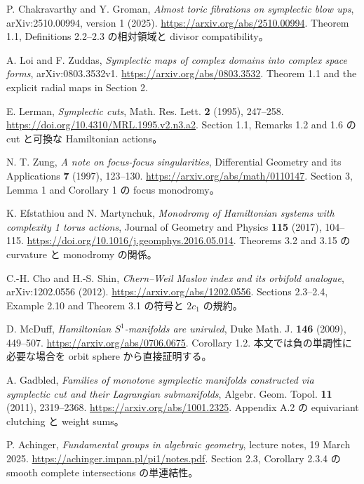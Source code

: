 P. Chakravarthy and Y. Groman,
\emph{Almost toric fibrations on symplectic blow ups},
arXiv:2510.00994, version 1 (2025).
\url{https://arxiv.org/abs/2510.00994}.
Theorem 1.1, Definitions 2.2--2.3 の相対領域と divisor compatibility。

A. Loi and F. Zuddas,
\emph{Symplectic maps of complex domains into complex space forms},
arXiv:0803.3532v1.
\url{https://arxiv.org/abs/0803.3532}.
Theorem 1.1 and the explicit radial maps in Section 2.


E. Lerman,
\emph{Symplectic cuts},
Math. Res. Lett. \textbf{2} (1995), 247--258.
\url{https://doi.org/10.4310/MRL.1995.v2.n3.a2}.
Section 1.1, Remarks 1.2 and 1.6 の cut と可換な Hamiltonian actions。

N. T. Zung,
\emph{A note on focus-focus singularities},
Differential Geometry and its Applications \textbf{7} (1997), 123--130.
\url{https://arxiv.org/abs/math/0110147}.
Section 3, Lemma 1 and Corollary 1 の focus monodromy。

K. Efstathiou and N. Martynchuk,
\emph{Monodromy of Hamiltonian systems with complexity 1 torus actions},
Journal of Geometry and Physics \textbf{115} (2017), 104--115.
\url{https://doi.org/10.1016/j.geomphys.2016.05.014}.
Theorems 3.2 and 3.15 の curvature と monodromy の関係。

C.-H. Cho and H.-S. Shin,
\emph{Chern--Weil Maslov index and its orbifold analogue},
arXiv:1202.0556 (2012).
\url{https://arxiv.org/abs/1202.0556}.
Sections 2.3--2.4, Example 2.10 and Theorem 3.1 の符号と $2c_1$ の規約。


D. McDuff,
\emph{Hamiltonian $S^1$-manifolds are uniruled},
Duke Math. J. \textbf{146} (2009), 449--507.
\url{https://arxiv.org/abs/0706.0675}.
Corollary 1.2. 本文では負の単調性に必要な場合を orbit sphere から直接証明する。

A. Gadbled,
\emph{Families of monotone symplectic manifolds constructed via symplectic cut and their Lagrangian submanifolds},
Algebr. Geom. Topol. \textbf{11} (2011), 2319--2368.
\url{https://arxiv.org/abs/1001.2325}.
Appendix A.2 の equivariant clutching と weight sums。

P. Achinger,
\emph{Fundamental groups in algebraic geometry},
lecture notes, 19 March 2025.
\url{https://achinger.impan.pl/pi1/notes.pdf}.
Section 2.3, Corollary 2.3.4 の smooth complete intersections の単連結性。


